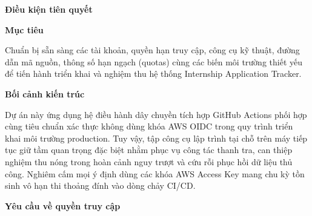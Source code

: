 \vspace{0.5em}\noindent\textbf{Điều kiện tiên
quyết}\par

\vspace{0.5em}\noindent\textbf{Mục tiêu}\par

Chuẩn bị sẵn sàng các tài khoản, quyền hạn truy cập, công cụ kỹ thuật,
đường dẫn mã nguồn, thông số hạn ngạch (quotas) cùng các biến môi trường
thiết yếu để tiến hành triển khai và nghiệm thu hệ thống Internship
Application Tracker.

\vspace{0.5em}\noindent\textbf{Bối cảnh kiến
trúc}\par

Dự án này ứng dụng hệ điều hành dây chuyền tích hợp GitHub Actions phối
hợp cùng tiêu chuẩn xác thực không dùng khóa AWS OIDC trong quy trình
triển khai môi trường production. Tuy vậy, tập công cụ lập trình tại chỗ
trên máy tiếp tục giữ tầm quan trọng đặc biệt nhằm phục vụ công tác
thanh tra, can thiệp nghiệm thu nóng trong hoàn cảnh nguy trượt và cứu
rỗi phục hồi dữ liệu thủ công. Nghiêm cấm mọi ý định dùng các khóa AWS
Access Key mang chu kỳ tồn sinh vô hạn thi thoảng đính vào dòng chảy
CI/CD.

\vspace{0.5em}\noindent\textbf{Yêu cầu về quyền truy
cập}\par

